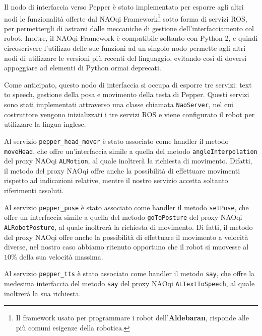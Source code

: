 Il nodo di interfaccia verso Pepper è stato implementato per esporre agli altri nodi le funzionalità offerte dal NAOqi Framework\footnote{Il framework usato per programmare i robot dell'\textbf{Aldebaran}, risponde alle più comuni esigenze della robotica.} sotto forma di servizi ROS, per permettergli di astrarsi dalle meccaniche di gestione dell'interfacciamento col robot. Inoltre, il NAOqi Framework è compatibile soltanto con Python 2, e quindi circoscrivere l'utilizzo delle sue funzioni ad un singolo nodo permette agli altri nodi di utilizzare le versioni più recenti del linguaggio, evitando così di doversi appoggiare ad elementi di Python ormai deprecati.


Come anticipato, questo nodo di interfaccia si occupa di esporre tre servizi: text to speech, gestione della posa e movimento della testa di Pepper. 
Questi servizi sono stati implementati attraverso una classe chiamata \verb|NaoServer|, nel cui costruttore vengono inizializzati i tre servizi ROS e viene configurato il robot per utilizzare la lingua inglese.

Al servizio \verb|pepper_head_mover| è stato associato come handler il metodo \verb|moveHead|, che offre un'interfaccia simile a quella del metodo \verb|angleInterpolation| del proxy NAOqi \verb|ALMotion|, al quale inoltrerà la richiesta di movimento. Difatti, il metodo del proxy NAOqi offre anche la possibilità di effettuare movimenti rispetto ad indicazioni relative, mentre il nostro servizio accetta soltanto riferimenti assoluti.

Al servizio \verb|pepper_pose| è stato associato come handler il metodo \verb|setPose|, che offre un interfaccia simile a quella del metodo \verb|goToPosture| del proxy NAOqi \verb|ALRobotPosture|, al quale inoltrerà la richiesta di movimento. Di fatti, il metodo del proxy NAOqi offre anche la possibilità di effettuare il movimento a velocità diverse, nel nostro caso abbiamo ritenuto opportuno che il robot si muovesse al $10\%$ della sua velocità massima.

Al servizio \verb|pepper_tts| è stato associato come handler il metodo \verb|say|, che offre la medesima interfaccia del metodo \verb|say| del proxy NAOqi \verb|ALTextToSpeech|, al quale inoltrerà la sua richiesta.

